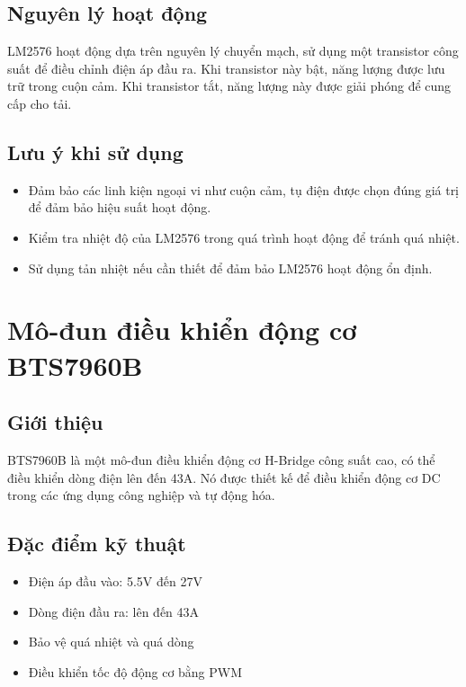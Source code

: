         \subsection{Nguyên lý hoạt động}
            LM2576 hoạt động dựa trên nguyên lý chuyển mạch, sử dụng một transistor công suất để điều chỉnh điện áp đầu ra. Khi transistor này bật, năng lượng được lưu trữ trong cuộn cảm. Khi transistor tắt, năng lượng này được giải phóng để cung cấp cho tải.
            
        \subsection{Lưu ý khi sử dụng}
            \begin{itemize}
                \item Đảm bảo các linh kiện ngoại vi như cuộn cảm, tụ điện được chọn đúng giá trị để đảm bảo hiệu suất hoạt động.
                \item Kiểm tra nhiệt độ của LM2576 trong quá trình hoạt động để tránh quá nhiệt.
                \item Sử dụng tản nhiệt nếu cần thiết để đảm bảo LM2576 hoạt động ổn định.
            \end{itemize}
    \section{Mô-đun điều khiển động cơ BTS7960B}     
        \subsection{Giới thiệu}
            BTS7960B là một mô-đun điều khiển động cơ H-Bridge công suất cao, có thể điều khiển dòng điện lên đến 43A. Nó được thiết kế để điều khiển động cơ DC trong các ứng dụng công nghiệp và tự động hóa.
            
        \subsection{Đặc điểm kỹ thuật}
            \begin{itemize}
                \item Điện áp đầu vào: 5.5V đến 27V
                \item Dòng điện đầu ra: lên đến 43A
                \item Bảo vệ quá nhiệt và quá dòng
                \item Điều khiển tốc độ động cơ bằng PWM
            \end{itemize}
            
